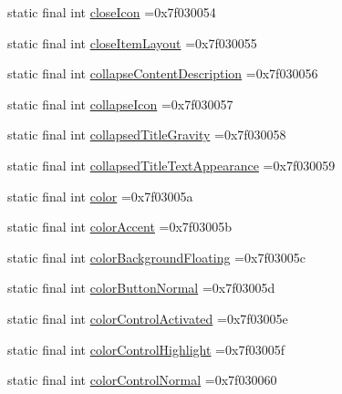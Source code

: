 \begin{DoxyCompactItemize}
\item 
static final int \mbox{\hyperlink{classcom_1_1example_1_1trainawearapplication_1_1_r_1_1attr_ac9d9c4e0778b08c2c91ad2f622e4270f}{close\+Icon}} =0x7f030054
\item 
static final int \mbox{\hyperlink{classcom_1_1example_1_1trainawearapplication_1_1_r_1_1attr_aab0fe8f33c33e9568d975b0820208345}{close\+Item\+Layout}} =0x7f030055
\item 
static final int \mbox{\hyperlink{classcom_1_1example_1_1trainawearapplication_1_1_r_1_1attr_a448d3a65001709d554fac36ffcf22fac}{collapse\+Content\+Description}} =0x7f030056
\item 
static final int \mbox{\hyperlink{classcom_1_1example_1_1trainawearapplication_1_1_r_1_1attr_a26ff1b3be04b2712ee08021a2aef8a27}{collapse\+Icon}} =0x7f030057
\item 
static final int \mbox{\hyperlink{classcom_1_1example_1_1trainawearapplication_1_1_r_1_1attr_a5bd70475863b3286f30a180fa9065d9e}{collapsed\+Title\+Gravity}} =0x7f030058
\item 
static final int \mbox{\hyperlink{classcom_1_1example_1_1trainawearapplication_1_1_r_1_1attr_a1a99799dc23a80dfc583751120ae2b4a}{collapsed\+Title\+Text\+Appearance}} =0x7f030059
\item 
static final int \mbox{\hyperlink{classcom_1_1example_1_1trainawearapplication_1_1_r_1_1attr_a18bb9e7e95408c9cb64d48932f9bf381}{color}} =0x7f03005a
\item 
static final int \mbox{\hyperlink{classcom_1_1example_1_1trainawearapplication_1_1_r_1_1attr_acbe3a1be6dcb1a93780b63de69fb8329}{color\+Accent}} =0x7f03005b
\item 
static final int \mbox{\hyperlink{classcom_1_1example_1_1trainawearapplication_1_1_r_1_1attr_ac2b125d42fa995ac93e1989a8b157a95}{color\+Background\+Floating}} =0x7f03005c
\item 
static final int \mbox{\hyperlink{classcom_1_1example_1_1trainawearapplication_1_1_r_1_1attr_a84b974a4663c47f452381c6a02ec7969}{color\+Button\+Normal}} =0x7f03005d
\item 
static final int \mbox{\hyperlink{classcom_1_1example_1_1trainawearapplication_1_1_r_1_1attr_aefcb90745f0ce1778740db88039860d1}{color\+Control\+Activated}} =0x7f03005e
\item 
static final int \mbox{\hyperlink{classcom_1_1example_1_1trainawearapplication_1_1_r_1_1attr_a344d9549b94d0535748d8999fb8ad591}{color\+Control\+Highlight}} =0x7f03005f
\item 
static final int \mbox{\hyperlink{classcom_1_1example_1_1trainawearapplication_1_1_r_1_1attr_aa28d48cdf44eafacbd97a92def381f28}{color\+Control\+Normal}} =0x7f030060

\end{DoxyCompactItemize}
